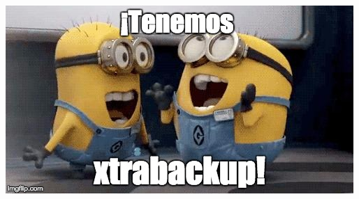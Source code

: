 \documentclass[UTF8]{beamer}
\begin{document}
\begin{frame}
	\includegraphics[width=\textwidth,height=\textheight,keepaspectratio]{tenemos_xtrabackup}	
	
\end{frame}
	
	
	
	
	
	
\end{document}
